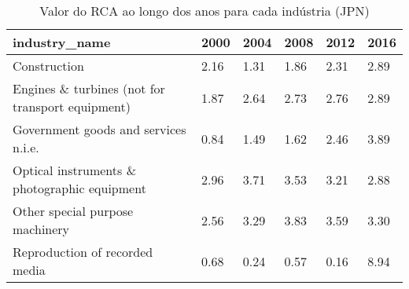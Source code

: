 \begin{table}
\centering
\caption{Valor do RCA ao longo dos anos para cada indústria (JPN)}
\begin{tabular}{p{6cm}p{1.5cm}p{1.5cm}p{1.5cm}p{1.5cm}p{1.5cm}}
\toprule
                                   industry\_name & 2000 & 2004 & 2008 & 2012 & 2016 \\
\midrule
                                    Construction & 2.16 & 1.31 & 1.86 & 2.31 & 2.89 \\
Engines \& turbines (not for transport equipment) & 1.87 & 2.64 & 2.73 & 2.76 & 2.89 \\
            Government goods and services n.i.e. & 0.84 & 1.49 & 1.62 & 2.46 & 3.89 \\
    Optical instruments \& photographic equipment & 2.96 & 3.71 & 3.53 & 3.21 & 2.88 \\
                 Other special purpose machinery & 2.56 & 3.29 & 3.83 & 3.59 & 3.30 \\
                  Reproduction of recorded media & 0.68 & 0.24 & 0.57 & 0.16 & 8.94 \\
\bottomrule
\end{tabular}
\end{table}

